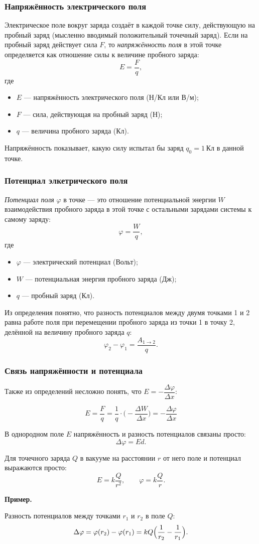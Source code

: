 \documentclass[12pt, a4paper]{article}%
\begin{document}
\subsubsection*{Напряжённость электрического поля}

Электрическое поле вокруг заряда создаёт в каждой точке силу, действующую на пробный заряд (мысленно вводимый положительный точечный заряд). Если на пробный заряд действует сила $F$, то \textit{напряжённость поля} в этой точке определяется как отношение силы к величине пробного заряда:
\[
E = \frac{F}{q},
\]
где
\begin{itemize}
  \item $E$ — напряжённость электрического поля (Н/Кл или В/м);
  \item $F$ — сила, действующая на пробный заряд (Н);
  \item $q$ — величина пробного заряда (Кл).
\end{itemize}
Напряжённость показывает, какую силу испытал бы заряд $q_0 = 1$ Кл в данной точке. 

\subsubsection*{Потенциал элкетрического поля}
\textit{Потенциал поля} $\varphi$ в точке — это отношение потенциальной энергии $W$ взаимодействия пробного заряда в этой точке с остальными зарядами системы к самому заряду:
\[
\varphi = \frac{W}{q},
\]
где
\begin{itemize}
  \item $\varphi$ — электрический потенциал (Вольт);
  \item $W$ — потенциальная энергия пробного заряда (Дж);
  \item $q$ — пробный заряд (Кл).
\end{itemize}
Из определения понятно, что разность потенциалов между двумя точками 1 и 2 равна работе поля при перемещении пробного заряда из 
точки 1 в точку 2, делённой на величину пробного заряда $q$:
\[
\varphi_2 - \varphi_1 = \frac{A_{1\to2}}{q}.
\]

\subsubsection*{Связь напряжённости и потенциала}
Также из определений несложно понять, что $E = -\dfrac{\Delta \varphi}{\Delta x}$:

\[
E = \frac{F}{q} = \frac{1}{q} \cdot \bigl(-\frac{\Delta W}{\Delta x}\bigr) = -\frac{\Delta \varphi}{\Delta x}
\]



В однородном поле $E$ напряжённость и разность потенциалов связаны просто:
\[
\Delta\varphi = Ed.
\]

Для точечного заряда $Q$ в вакууме на расстоянии $r$ от него поле и потенциал выражаются просто:
\[
E = k \frac{Q}{r^2},
\qquad
\varphi = k \frac{Q}{r}.
\]

\textbf{Пример.}

Разность потенциалов между точками $r_1$ и $r_2$ в поле $Q$:
\[
\Delta\varphi = \varphi(r_2) - \varphi(r_1)
= k Q\Bigl(\frac{1}{r_2} - \frac{1}{r_1}\Bigr).
\]
\end{document}
